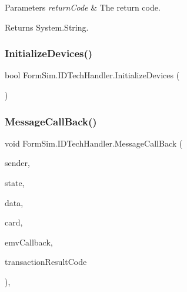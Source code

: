 \begin{DoxyParams}{Parameters}
{\em return\+Code} & The return code.\\
\hline
\end{DoxyParams}
\begin{DoxyReturn}{Returns}
System.\+String.
\end{DoxyReturn}
\mbox{\label{class_form_sim_1_1_i_d_tech_handler_a4b2e99d93096fd3a983bd4a33441846a}} 
\subsubsection{\texorpdfstring{Initialize\+Devices()}{InitializeDevices()}}
{\footnotesize\ttfamily bool Form\+Sim.\+I\+D\+Tech\+Handler.\+Initialize\+Devices (\begin{DoxyParamCaption}{ }\end{DoxyParamCaption})\hspace{0.3cm}{\ttfamily [inline]}}

\mbox{\label{class_form_sim_1_1_i_d_tech_handler_ac039818aafdf35c179dbf0382d3d0f2f}} 
\subsubsection{\texorpdfstring{Message\+Call\+Back()}{MessageCallBack()}}
{\footnotesize\ttfamily void Form\+Sim.\+I\+D\+Tech\+Handler.\+Message\+Call\+Back (\begin{DoxyParamCaption}\item[{I\+D\+T\+\_\+\+D\+E\+V\+I\+C\+E\+\_\+\+Types}]{sender,  }\item[{Device\+State}]{state,  }\item[{byte \mbox{[}$\,$\mbox{]}}]{data,  }\item[{I\+D\+T\+Transaction\+Data}]{card,  }\item[{E\+M\+V\+\_\+\+Callback}]{emv\+Callback,  }\item[{R\+E\+T\+U\+R\+N\+\_\+\+C\+O\+DE}]{transaction\+Result\+Code }\end{DoxyParamCaption})\hspace{0.3cm}{\ttfamily [inline]}, {\ttfamily [private]}}

